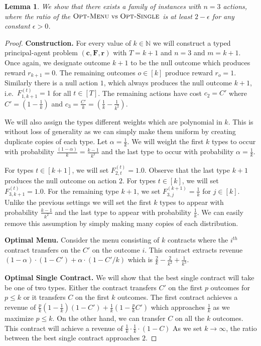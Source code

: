 \documentclass{article}
\newtheorem{lemma}[theorem]{Lemma}
\newcommand{\N}{\mathbb{N}}
\newcommand{\cost}[1]{c_{#1}}
\newcommand{\costvector}{\bm{c}}
\newcommand{\TypedForecast}[3]{F^{(#1)}_{#2, #3}}
\newcommand{\ForecastTensor}{\bm{F}}
\newcommand{\rewardvector}{\bm{r}}
\newcommand{\OMenu}{\textsc{Opt-Menu}}
\newcommand{\OSingle}{\textsc{Opt-Single}}
\begin{document}
\begin{lemma}
\label{lem:gap3v4}
We show that there exists a family of instances with $n=3$ actions, where the ratio of the $\OMenu \text{ vs }\OSingle$  is at least $2 - \epsilon $ for any constant $\epsilon>0$. 
\end{lemma}
\begin{proof}

\textbf{Construction.}
For every value of $k \in \N$ we will construct a typed principal-agent problem $(\costvector,\ForecastTensor,\rewardvector)$ 
with $T = k+1$ and $n=3$ and $m=k+1$. Once again, we designate
outcome $k+1$ to be the null outcome which produces reward 
$r_{k+1}=0$. The remaining outcomes $o \in [k]$ produce reward
$r_o = 1$. Similarly there is a null action $1$, which always 
produces the null outcome $k+1$, i.e.~$\TypedForecast{t}{1}{k+1}=1$ for all $t \in [T]$. The 
remaining actions  have cost $\cost{2} = C'$ where $C' = (1-\frac1k)$ and 
$\cost{3} = \frac{C'}{k} =  (\frac1k - \frac{1}{k^2})$. 

We will also assign the types different weights which are polynomial in $k$. This is 
without loss of generality as we can simply make them uniform by creating duplicate copies of 
each type. Let $\alpha = \frac1k$.  We will weight the first $k$ types to occur with probability 
$ \frac{(1-\alpha)}{k} = \frac{k-1}{k^2}$ and the last type to occur with probability $\alpha = \frac1k$. 

For types $t \in [k+1]$, we will set
$\TypedForecast{t}{2}{t}= 1.0$.  Observe that the 
last type $k+1$ produces the null outcome on action $2$.   For types $t \in [k]$, we will set 
$\TypedForecast{t}{3}{k+1}= 1.0$. 
For the  remaining type $k+1$,  we set $\TypedForecast{k+1}{3}{j} = \frac1k$ for $j \in [k]$. 
Unlike the previous settings we will set the first $k$ types to appear with probability 
$\frac{k-1}{k^2}$ and the last type to appear with probability $\frac{1}{k}$.  We can easily remove 
this assumption by simply making many copies of each distribution. 


\textbf{Optimal Menu.}
Consider the menu consisting of $k$ contracts where the $i^{th}$ contract transfers on the $C'$ on the 
outcome $i$. This contract extracts revenue  
$(1-\alpha)\cdot (1-C') + \alpha \cdot (1-C'/k)$ which is $\frac2k - \frac{2}{k^2} + \frac{1}{k^3}$. 

\textbf{Optimal Single Contract.}
We will show that the best single contract will take be one of two types. 
Either the contract transfers $C'$  on the first $p$ outcomes for $p \leq k$ or it transfers $C$ on the first $k$ outcomes. 
The first contract achieves  a revenue of $\frac{p}{k} ( 1- \frac1k) (1-C')+ \frac1k(1- \frac{p}{k} C')$ which approaches $\frac1k$ as we
maximize $p \leq k$.   On the other hand, we can transfer $C$ on all the $k$ outcomes. This contract will achieve a revenue of $\frac1k \cdot \frac1k \cdot (1-C)$ As we set $k \to \infty$, the ratio between the best single contract approaches $2$. 


\end{proof}
\end{document}
